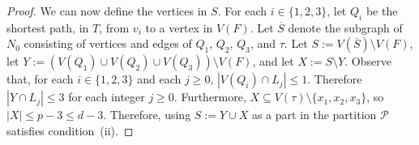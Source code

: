 \documentclass{patmorin}
\theoremstyle{plain}
\theoremstyle{definition}
\DeclareMathOperator{\dist}{dist}
\newcommand{\PP}{\mathcal{P}}
\renewcommand{\ge}{\geqslant}
\renewcommand{\le}{\leqslant}
\begin{document}
\begin{proof}
	We can now define the vertices in $S$.  For each $i\in\{1,2,3\}$, let $Q_i$ be the shortest path, in $T$, from $v_i$ to a vertex in $V(F)$.  Let $\overline{S}$ denote the subgraph of $N_0$ consisting of vertices and edges of $Q_1$, $Q_2$, $Q_3$, and $\tau$.
	Let $S:=V(\overline{S})\setminus V(F)$, let $Y:=(V(Q_1)\cup V(Q_2)\cup V(Q_3))\setminus V(F)$, and let $X:=S\setminus Y$. Observe that, for each $i\in\{1,2,3\}$ and each $j\ge 0$, $|V(Q_i)\cap L_j|\le 1$.  Therefore $|Y\cap L_j|\le 3$ for each integer $j\ge 0$. Furthermore, $X\subseteq V(\tau)\setminus\{x_1,x_2,x_3\}$, so $|X|\le p-3\le d-3$. Therefore, using $S:=Y\cup X$ as a part in the partition $\PP$ satisfies condition~(ii).




\end{proof}
\end{document}

